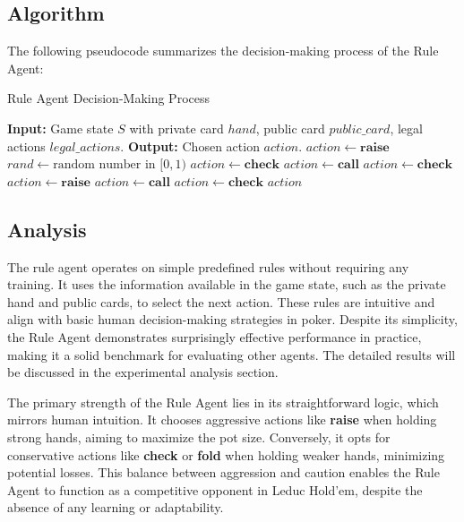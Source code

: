 \documentclass{article}
\begin{document}
\subsection{Algorithm}

The following pseudocode summarizes the decision-making process of the Rule Agent:

\begin{algorithm}[H]
\caption{Rule Agent Decision-Making Process}
\begin{algorithmic}[1]
\STATE \textbf{Input:} Game state $S$ with private card $hand$, public card $public\_card$, legal actions $legal\_actions$.
\STATE \textbf{Output:} Chosen action $action$.
        \STATE $action \gets \textbf{raise}$
    \ELSE
            \STATE $rand \gets \text{random number in } [0, 1)$
                \STATE $action \gets \textbf{check}$
            \ELSE
                \STATE $action \gets \textbf{call}$
            \ENDIF
        \ELSE
            \STATE $action \gets \textbf{check}$
        \ENDIF
    \ENDIF
\ELSE
        \STATE $action \gets \textbf{raise}$
    \ELSE
            \STATE $action \gets \textbf{call}$
        \ELSE
            \STATE $action \gets \textbf{check}$
        \ENDIF
    \ENDIF
\ENDIF
\RETURN $action$
\end{algorithmic}
\end{algorithm}

\subsection{Analysis}
The rule agent operates on simple predefined rules without requiring any training. It uses the information available in the game state, such as the private hand and public cards, to select the next action. These rules are intuitive and align with basic human decision-making strategies in poker. Despite its simplicity, the Rule Agent demonstrates surprisingly effective performance in practice, making it a solid benchmark for evaluating other agents. The detailed results will be discussed in the experimental analysis section.

The primary strength of the Rule Agent lies in its straightforward logic, which mirrors human intuition. It chooses aggressive actions like \textbf{raise} when holding strong hands, aiming to maximize the pot size. Conversely, it opts for conservative actions like \textbf{check} or \textbf{fold} when holding weaker hands, minimizing potential losses. This balance between aggression and caution enables the Rule Agent to function as a competitive opponent in Leduc Hold’em, despite the absence of any learning or adaptability.
\end{document}
